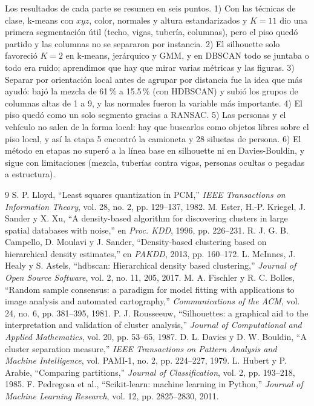 \documentclass[10pt,a4paper]{article}
\begin{document}
Los resultados de cada parte se resumen en seis puntos. 1) Con las técnicas de clase,
k-means con $xyz$, color, normales y altura estandarizados y $K=11$ dio una primera
segmentación útil (techo, vigas, tubería, columnas), pero el piso quedó partido y las columnas
no se separaron por instancia. 2) El silhouette solo favoreció $K=2$ en k-means, jerárquico y
GMM, y en DBSCAN todo se juntaba o todo era ruido; aprendimos que hay que mirar varias métricas
y las figuras. 3) Separar por orientación local antes de agrupar por distancia fue la idea que
más ayudó: bajó la mezcla de 61\,\% a 15.5\,\% (con HDBSCAN) y subió los grupos de columnas
altas de 1 a 9, y las normales fueron la variable más importante. 4) El piso quedó como un solo
segmento gracias a RANSAC. 5) Las personas y el vehículo no salen de la forma local: hay que
buscarlos como objetos libres sobre el piso local, y así la etapa 5 encontró la camioneta y 28
siluetas de persona. 6) El método en etapas no superó a la línea base en silhouette ni en
Davies-Bouldin, y sigue con limitaciones (mezcla, tuberías contra vigas, personas ocultas o
pegadas a estructura).

\begin{thebibliography}{9}
 S. P. Lloyd, ``Least squares quantization in PCM,'' \textit{IEEE Transactions on Information Theory}, vol. 28, no. 2, pp. 129--137, 1982.
 M. Ester, H.-P. Kriegel, J. Sander y X. Xu, ``A density-based algorithm for discovering clusters in large spatial databases with noise,'' en \textit{Proc. KDD}, 1996, pp. 226--231.
 R. J. G. B. Campello, D. Moulavi y J. Sander, ``Density-based clustering based on hierarchical density estimates,'' en \textit{PAKDD}, 2013, pp. 160--172.
 L. McInnes, J. Healy y S. Astels, ``hdbscan: Hierarchical density based clustering,'' \textit{Journal of Open Source Software}, vol. 2, no. 11, 205, 2017.
 M. A. Fischler y R. C. Bolles, ``Random sample consensus: a paradigm for model fitting with applications to image analysis and automated cartography,'' \textit{Communications of the ACM}, vol. 24, no. 6, pp. 381--395, 1981.
 P. J. Rousseeuw, ``Silhouettes: a graphical aid to the interpretation and validation of cluster analysis,'' \textit{Journal of Computational and Applied Mathematics}, vol. 20, pp. 53--65, 1987.
 D. L. Davies y D. W. Bouldin, ``A cluster separation measure,'' \textit{IEEE Transactions on Pattern Analysis and Machine Intelligence}, vol. PAMI-1, no. 2, pp. 224--227, 1979.
 L. Hubert y P. Arabie, ``Comparing partitions,'' \textit{Journal of Classification}, vol. 2, pp. 193--218, 1985.
 F. Pedregosa et al., ``Scikit-learn: machine learning in Python,'' \textit{Journal of Machine Learning Research}, vol. 12, pp. 2825--2830, 2011.
\end{thebibliography}
\end{document}
